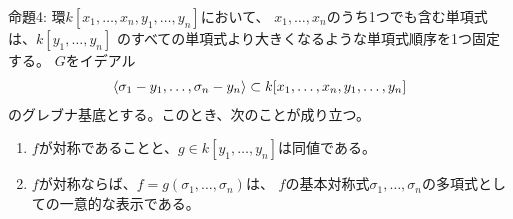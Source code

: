 \begin{framed}
  命題4: 環$k[x_1,\dots,x_n,y_1,\dots,y_n]$において、
  $x_1,\dots,x_n$のうち1つでも含む単項式は、$k[y_1,\dots,y_n]$
  のすべての単項式より大きくなるような単項式順序を1つ固定する。
  $G$をイデアル
  \begin{align}
    \left\langle \sigma_1-y_1,\dots,\sigma_n-y_n \right\rangle\subset k[x_1,\dots,x_n,y_1,\dots,y_n]
  \end{align}
  のグレブナ基底とする。このとき、次のことが成り立つ。
  \begin{enumerate}[label=(\roman*)]
    \item $f$が対称であることと、$g\in k[y_1,\dots,y_n]$は同値である。
    \item $f$が対称ならば、$f=g(\sigma_1,\dots,\sigma_n)$は、
    $f$の基本対称式$\sigma_1,\dots,\sigma_n$の多項式としての一意的な表示である。
  \end{enumerate}
\end{framed}
